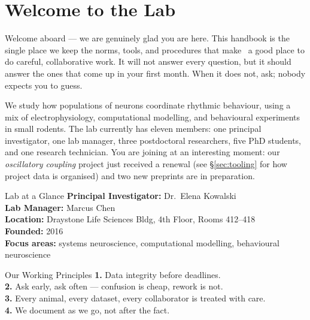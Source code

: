 \section{Welcome to the Lab}

Welcome aboard --- we are genuinely glad you are here. This handbook is the single place we
keep the norms, tools, and procedures that make \labname\ a good place to do careful,
collaborative work. It will not answer every question, but it should answer the ones that
come up in your first month. When it does not, ask; nobody expects you to guess.

We study how populations of neurons coordinate rhythmic behaviour, using a mix of
electrophysiology, computational modelling, and behavioural experiments in small rodents.
The lab currently has eleven members: one principal investigator, one lab manager, three
postdoctoral researchers, five PhD students, and one research technician. You are joining at
an interesting moment: our \emph{oscillatory coupling} project just received a renewal (see
\S\ref{sec:tooling} for how project data is organised) and two new preprints are in
preparation.

\begin{minipage}[t]{0.485\textwidth}
\begin{factbox}{Lab at a Glance}
\textbf{Principal Investigator:} Dr.\ Elena Kowalski\\
\textbf{Lab Manager:} Marcus Chen\\
\textbf{Location:} Draystone Life Sciences Bldg, 4th Floor, Rooms 412--418\\
\textbf{Founded:} 2016\\
\textbf{Focus areas:} systems neuroscience, computational modelling, behavioural neuroscience
\end{factbox}
\end{minipage}\hfill%
\begin{minipage}[t]{0.485\textwidth}
\begin{factbox}{Our Working Principles}
\textbf{1.} Data integrity before deadlines.\\
\textbf{2.} Ask early, ask often --- confusion is cheap, rework is not.\\
\textbf{3.} Every animal, every dataset, every collaborator is treated with care.\\
\textbf{4.} We document as we go, not after the fact.
\end{factbox}
\end{minipage}
\par

